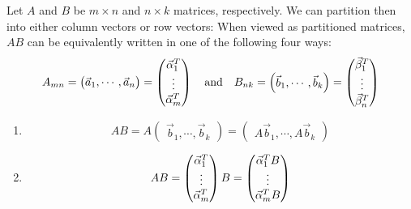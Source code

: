 \documentclass[pdf,9pt]{beamer}
\begin{document}
\begin{frame}[fragile]

    \begin{example}
    Let $A$ and $B$ be $m\times n$ and $n\times k$ matrices, respectively.
    We can partition then into either column vectors or row vectors:
    \pause
    When viewed as partitioned matrices, $AB$ can be equivalently written in one of the following four ways:
    \vspace{1em}
    \[
	A_{mn} =
	\begin{pmatrix} \vec{a}_1,\cdots,\vec{a}_n \end{pmatrix}
	= \begin{pmatrix} \vec{\alpha}_1^T \cr \vdots\cr \vec{\alpha}_m^T \end{pmatrix}
	\quad\text{and}\quad
	B_{nk} =
	\begin{pmatrix} \vec{b}_1,\cdots,\vec{b}_k \end{pmatrix}
	= \begin{pmatrix} \vec{\beta}_1^T \cr \vdots\cr \vec{\beta}_n^T \end{pmatrix}
    \]
    \begin{enumerate}
        \item
    \[
	AB = A \begin{pmatrix} \vec{b}_1,\cdots,\vec{b}_k \end{pmatrix}  =
	    \begin{pmatrix}A \vec{b}_1,\cdots,A\vec{b}_k \end{pmatrix}
    \]
    \vfill
        \item
    \[
	AB = \begin{pmatrix} \vec{\alpha}_1^T \cr \vdots\cr \vec{\alpha}_m^T \end{pmatrix} B
	 =   \begin{pmatrix} \vec{\alpha}_1^T B\cr \vdots\cr \vec{\alpha}_m^T B\end{pmatrix}
    \]
    \end{enumerate}
    \end{example}
\end{frame}
\end{document}
